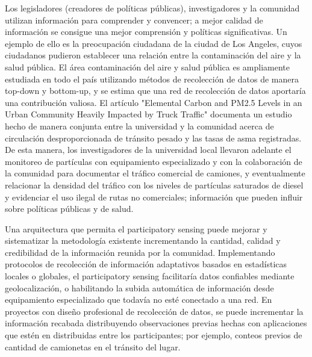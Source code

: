 	Los legisladores (creadores de políticas públicas), investigadores y la comunidad utilizan información para comprender y convencer; a mejor calidad de información se consigue una mejor comprensión y políticas significativas. Un ejemplo de ello es la preocupación ciudadana de la ciudad de Los Angeles, cuyos ciudadanos pudieron establecer una relación entre la contaminación del aire y la salud pública. El área contaminación del aire y salud pública es ampliamente estudiada en todo el país utilizando métodos de recolección de datos de manera top-down y bottom-up, y se estima que una red de recolección de datos aportaría una contribución valiosa. El artículo "Elemental Carbon and PM2.5 Levels in an Urban Community Heavily Impacted by Truck Traffic" documenta un estudio hecho de manera conjunta entre la universidad y la comunidad acerca de circulación desproporcionada de tránsito pesado y las tasas de asma registradas. De esta manera, los investigadores de la universidad local llevaron adelante el monitoreo de partículas con equipamiento especializado y con la colaboración de la comunidad para documentar el tráfico comercial de camiones, y eventualmente relacionar la densidad del tráfico con los niveles de partículas saturados de diesel y evidenciar el uso ilegal de rutas no comerciales; información que pueden influir sobre políticas públicas y de salud.
	
	Una arquitectura que permita el participatory sensing puede mejorar y sistematizar la metodología existente incrementando la cantidad, calidad y credibilidad de la información reunida por la comunidad. Implementando protocolos de recolección de información adaptativos basados en estadísticas locales o globales, el participatory sensing facilitaría datos confiables mediante geolocalización, o habilitando la subida automática de información desde equipamiento especializado que todavía no esté conectado a una red. En proyectos con diseño profesional de recolección de datos, se puede incrementar la información recabada distribuyendo observaciones previas hechas con aplicaciones que estén en distribuidas entre los participantes; por ejemplo, conteos previos de cantidad de camionetas en el tránsito del lugar.
	
